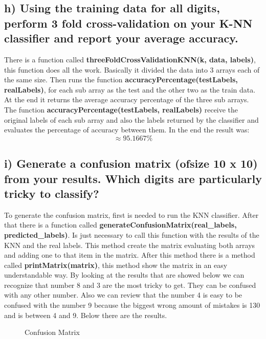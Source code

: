 \documentclass[11pt,letterpaper]{article}
\begin{document}
\subsection{h) Using the training data for all digits, perform 3 fold cross-validation on your K-NN classifier and report your average accuracy.}
There is a function called \textbf{threeFoldCrossValidationKNN(k, data, labels)}, this function does all the work. Basically it divided the data into 3 arrays each of the same size. Then  runs the function \textbf{accuracyPercentage(testLabels, realLabels)}, for each sub array as the test and the other two as the train data. At the end it returns the average accuracy percentage of the three sub arrays. The function \textbf{accuracyPercentage(testLabels, realLabels)} receive the original labels of each sub array and also the labels returned by the classifier and evaluates the percentage of accuracy between them. In the end the result was:
$$\approx 95.1667\%$$

\subsection{i) Generate a confusion matrix (ofsize 10 x 10) from your results. Which digits are particularly tricky to classify?}
To generate the confusion matrix, first is needed to run the KNN classifier. After that there is a function called \textbf{generateConfusionMatrix(real\_labels, predicted\_labels)}. Is just necessary to call this function with the results of the KNN and the real labels. This method create the matrix evaluating both arrays and adding one to that item in the matrix. After this method there is a method called \textbf{printMatrix(matrix)}, this method show the matrix in an easy understandable way. By looking at the results that are showed below we can recognize that number 8 and 3 are the most tricky to get. They can be confused with any other number. Also we can review that the number 4 is easy to be confused with the number 9 because the biggest wrong amount of mistakes is 130 and is between 4 and 9. Below there are the results.

\begin{figure}[ht!]
\centering
{}
\caption{Confusion Matrix}\label{Confusion Matrix}
\end{figure}
\end{document}
